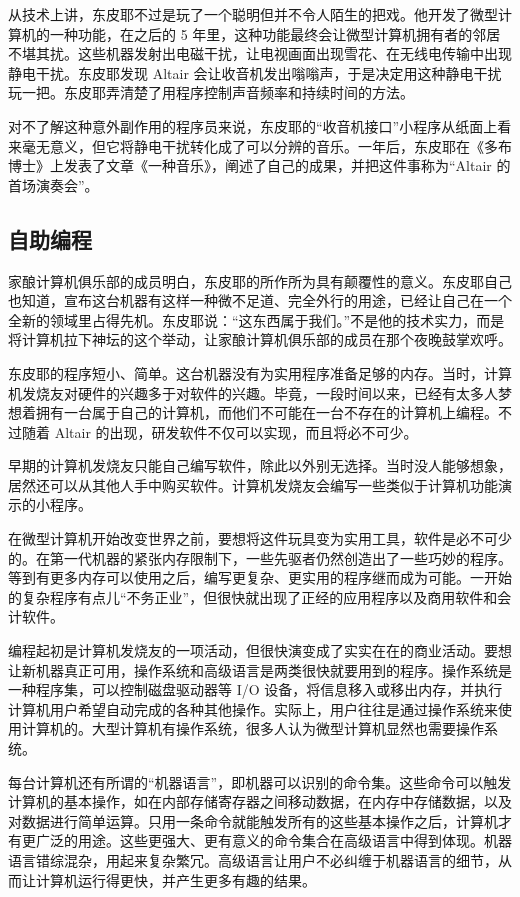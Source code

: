 \documentclass[12pt,UTF8]{ctexbook}
\begin{document}
从技术上讲，东皮耶不过是玩了一个聪明但并不令人陌生的把戏。他开发了微型计算机的一种功能，在之后的 5 年里，这种功能最终会让微型计算机拥有者的邻居不堪其扰。这些机器发射出电磁干扰，让电视画面出现雪花、在无线电传输中出现静电干扰。东皮耶发现 Altair 会让收音机发出嗡嗡声，于是决定用这种静电干扰玩一把。东皮耶弄清楚了用程序控制声音频率和持续时间的方法。

对不了解这种意外副作用的程序员来说，东皮耶的“收音机接口”小程序从纸面上看来毫无意义，但它将静电干扰转化成了可以分辨的音乐。一年后，东皮耶在《多布博士》上发表了文章《一种音乐》，阐述了自己的成果，并把这件事称为“Altair 的首场演奏会”。





\subsection{自助编程}


家酿计算机俱乐部的成员明白，东皮耶的所作所为具有颠覆性的意义。东皮耶自己也知道，宣布这台机器有这样一种微不足道、完全外行的用途，已经让自己在一个全新的领域里占得先机。东皮耶说：“这东西属于我们。”不是他的技术实力，而是将计算机拉下神坛的这个举动，让家酿计算机俱乐部的成员在那个夜晚鼓掌欢呼。

东皮耶的程序短小、简单。这台机器没有为实用程序准备足够的内存。当时，计算机发烧友对硬件的兴趣多于对软件的兴趣。毕竟，一段时间以来，已经有太多人梦想着拥有一台属于自己的计算机，而他们不可能在一台不存在的计算机上编程。不过随着 Altair 的出现，研发软件不仅可以实现，而且将必不可少。

早期的计算机发烧友只能自己编写软件，除此以外别无选择。当时没人能够想象，居然还可以从其他人手中购买软件。计算机发烧友会编写一些类似于计算机功能演示的小程序。

在微型计算机开始改变世界之前，要想将这件玩具变为实用工具，软件是必不可少的。在第一代机器的紧张内存限制下，一些先驱者仍然创造出了一些巧妙的程序。等到有更多内存可以使用之后，编写更复杂、更实用的程序继而成为可能。一开始的复杂程序有点儿“不务正业”，但很快就出现了正经的应用程序以及商用软件和会计软件。

编程起初是计算机发烧友的一项活动，但很快演变成了实实在在的商业活动。要想让新机器真正可用，操作系统和高级语言是两类很快就要用到的程序。操作系统是一种程序集，可以控制磁盘驱动器等 I/O 设备，将信息移入或移出内存，并执行计算机用户希望自动完成的各种其他操作。实际上，用户往往是通过操作系统来使用计算机的。大型计算机有操作系统，很多人认为微型计算机显然也需要操作系统。

每台计算机还有所谓的“机器语言”，即机器可以识别的命令集。这些命令可以触发计算机的基本操作，如在内部存储寄存器之间移动数据，在内存中存储数据，以及对数据进行简单运算。只用一条命令就能触发所有的这些基本操作之后，计算机才有更广泛的用途。这些更强大、更有意义的命令集合在高级语言中得到体现。机器语言错综混杂，用起来复杂繁冗。高级语言让用户不必纠缠于机器语言的细节，从而让计算机运行得更快，并产生更多有趣的结果。
\end{document}
